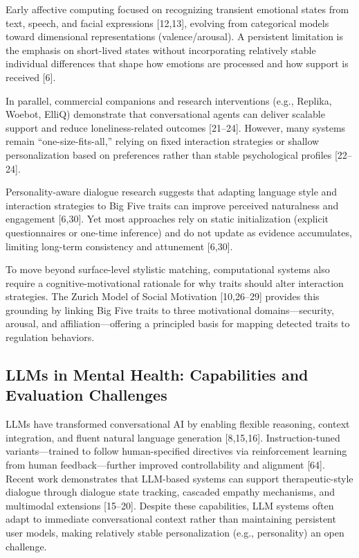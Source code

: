 \documentclass[apajournal,article,submit,moreauthors]{Definitions/mdpi}
\begin{document}
Early affective computing focused on recognizing transient emotional states from text, speech, and facial expressions {[}12,13{]}, evolving from categorical models toward dimensional representations (valence/arousal). A persistent limitation is the emphasis on short-lived states without incorporating relatively stable individual differences that shape how emotions are processed and how support is received {[}6{]}.

In parallel, commercial companions and research interventions (e.g., Replika, Woebot, ElliQ) demonstrate that conversational agents can deliver scalable support and reduce loneliness-related outcomes {[}21--24{]}. However, many systems remain ``one-size-fits-all,'' relying on fixed interaction strategies or shallow personalization based on preferences rather than stable psychological profiles {[}22--24{]}.

Personality-aware dialogue research suggests that adapting language style and interaction strategies to Big Five traits can improve perceived naturalness and engagement {[}6,30{]}. Yet most approaches rely on static initialization (explicit questionnaires or one-time inference) and do not update as evidence accumulates, limiting long-term consistency and attunement {[}6,30{]}.

To move beyond surface-level stylistic matching, computational systems also require a cognitive-motivational rationale for why traits should alter interaction strategies. The Zurich Model of Social Motivation {[}10,26--29{]} provides this grounding by linking Big Five traits to three motivational domains---security, arousal, and affiliation---offering a principled basis for mapping detected traits to regulation behaviors.

\subsection{LLMs in Mental Health: Capabilities and Evaluation Challenges}\label{llms-in-mental-health-capabilities-and-evaluation-challenges}

LLMs have transformed conversational AI by enabling flexible reasoning, context integration, and fluent natural language generation {[}8,15,16{]}. Instruction-tuned variants---trained to follow human-specified directives via reinforcement learning from human feedback---further improved controllability and alignment {[}64{]}. Recent work demonstrates that LLM-based systems can support therapeutic-style dialogue through dialogue state tracking, cascaded empathy mechanisms, and multimodal extensions {[}15--20{]}. Despite these capabilities, LLM systems often adapt to immediate conversational context rather than maintaining persistent user models, making relatively stable personalization (e.g., personality) an open challenge.
\end{document}
